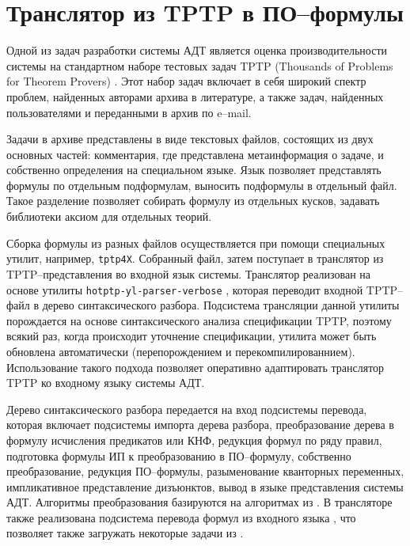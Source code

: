 \section{Транслятор из TPTP в ПО--формулы}
Одной из задач разработки системы АДТ является оценка производительности системы на стандартном наборе тестовых задач TPTP (Thousands of Problems for Theorem Provers) \cite{tptp}. Этот набор задач включает в себя широкий спектр проблем, найденных авторами архива в литературе, а также задач, найденных пользователями и переданными в архив по e--mail.

Задачи в архиве представлены в виде текстовых файлов, состоящих из двух основных частей: комментария, где представлена метаинформация о задаче, и собственно определения на специальном языке. Язык позволяет представлять формулы по отдельным подформулам, выносить подформулы в отдельный файл. Такое разделение позволяет собирать формулу из отдельных кусков, задавать библиотеки аксиом для отдельных теорий.

Сборка формулы из разных файлов осуществляется при помощи специальных утилит, например, \texttt{tptp4X}. Собранный файл, затем поступает в транслятор из TPTP--представления во входной язык системы. Транслятор реализован на основе утилиты \texttt{hotptp-yl-parser-verbose} \cite{TPTPTrans}, которая переводит входной TPTP--файл в дерево синтаксического разбора. Подсистема трансляции данной утилиты порождается на основе синтаксического анализа спецификации TPTP, поэтому всякий раз, когда происходит уточнение спецификации, утилита может быть обновлена автоматически (перепорождением и перекомпилированнием). Использование такого подхода позволяет оперативно адаптировать транслятор TPTP ко входному языку системы АДТ.

Дерево синтаксического разбора передается на вход подсистемы перевода, которая включает подсистемы импорта дерева разбора, преобразование дерева в формулу исчисления предикатов или КНФ, редукция формул по ряду правил, подготовка формулы ИП к преобразованию в ПО--формулу, собственно преобразование, редукция ПО--формулы, разыменование кванторных переменных, импликативное представление дизъюнктов, вывод в языке представления системы АДТ. Алгоритмы преобразования базируются на алгоритмах из \cite{dissChe}. В трансляторе также реализована подсистема перевода формул из входного языка \cite{dissChe}, что позволяет также загружать некоторые задачи из \cite{dissChe}.



